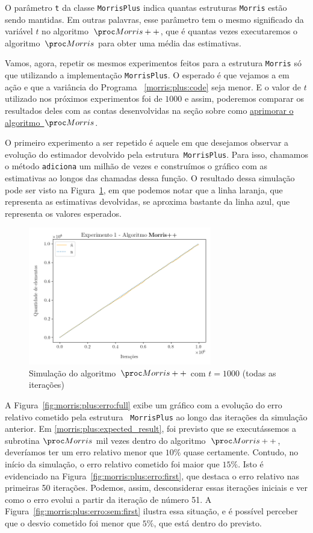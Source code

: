 O parâmetro \texttt{t} da classe \texttt{MorrisPlus} indica quantas estruturas \texttt{Morris} estão sendo mantidas. Em 
outras palavras, esse parâmetro tem o mesmo significado da variável $t$ no algoritmo~$\Morrispp$, que é quantas vezes 
executaremos o algoritmo~$\Morris$ para obter uma média das estimativas.

Vamos, agora, repetir os mesmos experimentos feitos para a estrutura \texttt{Morris} só que utilizando a implementação 
\texttt{MorrisPlus}. O esperado é que vejamos a  em ação e que a variância do Programa
~\ref{morris:plus:code} seja menor. E o valor de $t$ utilizado nos próximos experimentos foi de $1000$ e assim, 
poderemos comparar os resultados deles com as contas desenvolvidas na seção sobre como 
\hyperref[sec:morris:plus]{aprimorar o algoritmo~$\Morris$}.

O primeiro experimento a ser repetido é aquele em que desejamos observar a evolução do estimador devolvido pela 
estrutura~\texttt{MorrisPlus}. Para isso, chamamos o método \texttt{adiciona} um milhão de vezes e construímos o 
gráfico com as estimativas ao longos das chamadas dessa função. O resultado dessa simulação pode ser visto na 
Figura~\ref{fig:morris:plus:full}, em que podemos notar que a linha laranja, que representa as estimativas devolvidas, 
se aproxima bastante da linha azul, que representa os valores esperados.

\begin{figure}[h]
  \centering
  \includegraphics[height=6cm, width=\textwidth]{figuras/morris_plus_full.png}
	\caption{Simulação do algoritmo~$\Morrispp$ com $t = 1000$ (todas as iterações)}
  \label{fig:morris:plus:full}
\end{figure}

A Figura~\ref{fig:morris:plus:erro:full} exibe um gráfico com a evolução do erro relativo cometido pela estrutura
~\texttt{MorrisPlus} ao longo das iterações da simulação anterior. Em \eqref{morris:plus:expected_result}, foi previsto
que se executássemos a subrotina $\Morris$ mil vezes dentro do algoritmo~$\Morrispp$, deveríamos ter um erro relativo
menor que $10\%$ quase certamente. Contudo, no início da simulação, o erro relativo cometido foi maior que $15\%$. Isto 
é evidenciado na Figura~\ref{fig:morris:plus:erro:first}, que destaca o erro relativo nas primeiras 50 iterações. 
Podemos, assim, desconsiderar essas iterações iniciais e ver como o erro evolui a partir da iteração de número 51. A 
Figura~\ref{fig:morris:plus:erro:sem:first} ilustra essa situação, e é possível perceber que o desvio cometido foi menor
que $5\%$, que está dentro do previsto.

